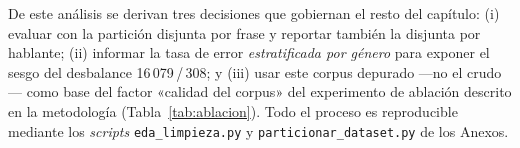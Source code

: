 De este an{\'a}lisis se derivan tres decisiones que gobiernan el resto del cap{\'i}tulo:
(i) evaluar con la partici{\'o}n disjunta por frase y reportar tambi{\'e}n la disjunta por
hablante; (ii) informar la tasa de error \emph{estratificada por g{\'e}nero} para exponer el
sesgo del desbalance 16\,079\,/\,308; y (iii) usar este corpus depurado ---no el crudo---
como base del factor «calidad del corpus» del experimento de ablaci{\'o}n descrito en la
metodolog{\'i}a (Tabla~\ref{tab:ablacion}). Todo el proceso es reproducible mediante los
\emph{scripts} \texttt{eda\_limpieza.py} y \texttt{particionar\_dataset.py} de los Anexos.

